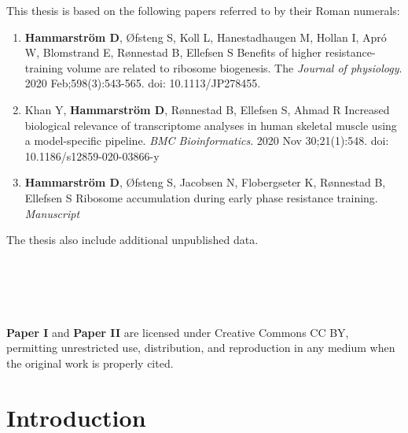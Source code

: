 \documentclass[twoside,10pt]{gihclass} %
\def\labelenumi{\Roman{enumi}.}
\begin{document}
  \begin{listofpapers}
    This thesis is based on the following papers referred to by their Roman numerals:
    \begin{enumerate}
    \def\labelenumi{\Roman{enumi}.}
    \item
      \textbf{Hammarström D}, Øfsteng S, Koll L, Hanestadhaugen M, Hollan I, Apró W, Blomstrand E, Rønnestad B, Ellefsen S Benefits of higher resistance-training volume are related to ribosome biogenesis. The \emph{Journal of physiology}. 2020 Feb;598(3):543-565. doi: 10.1113/JP278455.
    \item
      Khan Y, \textbf{Hammarström D}, Rønnestad B, Ellefsen S, Ahmad R Increased biological relevance of transcriptome analyses in human skeletal muscle using a model-specific pipeline. \emph{BMC Bioinformatics}. 2020 Nov 30;21(1):548. doi: 10.1186/s12859-020-03866-y
    \item
      \textbf{Hammarström D}, Øfsteng S, Jacobsen N, Flobergseter K, Rønnestad B, Ellefsen S Ribosome accumulation during early phase resistance training. \emph{Manuscript}
    \end{enumerate}
    The thesis also include additional unpublished data.\\
    ~\\
    ~\\
    ~\\
    ~\\
    ~\\
    \footnotesize
    \textbf{Paper I} and \textbf{Paper II} are licensed under Creative Commons CC BY, permitting unrestricted use, distribution, and reproduction in any medium when the original work is properly cited.
  \end{listofpapers}

  \hypersetup{linkcolor=black}
  \setcounter{tocdepth}{2}
  \tableofcontents

  \listoftables

  \listoffigures




\mainmatter %
\pagestyle{fancyplain} %

\setcounter{DefaultLines}{3}

\hypertarget{introduction}{%
\chapter{Introduction}\label{introduction}}
\end{document}
